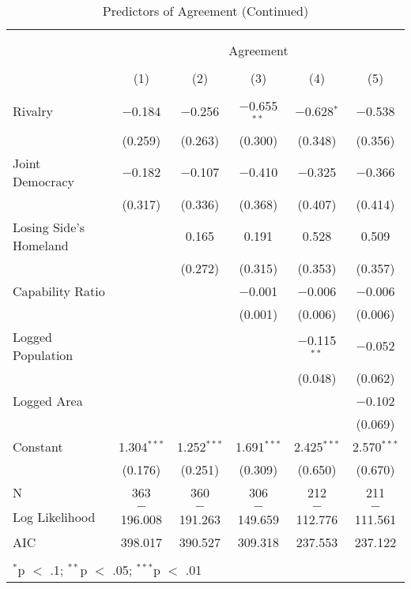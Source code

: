\documentclass{article}
\begin{document}
\begin{table}[!htbp] \centering 
  \caption{Predictors of Agreement (Continued)} 
  \label{} 
\begin{tabular}{@{\extracolsep{5pt}}lccccc} 
\\[-1.8ex]\hline \\[-1.8ex] 
\\[-1.8ex] & \multicolumn{5}{c}{Agreement} \\ 
\\[-1.8ex] & (1) & (2) & (3) & (4) & (5)\\ 
\hline \\[-1.8ex] 
 Rivalry & $-$0.184 & $-$0.256 & $-$0.655$^{**}$ & $-$0.628$^{*}$ & $-$0.538 \\ 
  & (0.259) & (0.263) & (0.300) & (0.348) & (0.356) \\ 
  Joint Democracy & $-$0.182 & $-$0.107 & $-$0.410 & $-$0.325 & $-$0.366 \\ 
  & (0.317) & (0.336) & (0.368) & (0.407) & (0.414) \\ 
  Losing Side's Homeland &  & 0.165 & 0.191 & 0.528 & 0.509 \\ 
  &  & (0.272) & (0.315) & (0.353) & (0.357) \\ 
  Capability Ratio &  &  & $-$0.001 & $-$0.006 & $-$0.006 \\ 
  &  &  & (0.001) & (0.006) & (0.006) \\ 
  Logged Population &  &  &  & $-$0.115$^{**}$ & $-$0.052 \\ 
  &  &  &  & (0.048) & (0.062) \\ 
  Logged Area &  &  &  &  & $-$0.102 \\ 
  &  &  &  &  & (0.069) \\ 
  Constant & 1.304$^{***}$ & 1.252$^{***}$ & 1.691$^{***}$ & 2.425$^{***}$ & 2.570$^{***}$ \\ 
  & (0.176) & (0.251) & (0.309) & (0.650) & (0.670) \\ 
 N & 363 & 360 & 306 & 212 & 211 \\ 
Log Likelihood & $-$196.008 & $-$191.263 & $-$149.659 & $-$112.776 & $-$111.561 \\ 
AIC & 398.017 & 390.527 & 309.318 & 237.553 & 237.122 \\ 
\hline \\[-1.8ex] 
\multicolumn{6}{l}{$^{*}$p $<$ .1; $^{**}$p $<$ .05; $^{***}$p $<$ .01} \\ 
\end{tabular} 
\end{table} 
\end{document}
